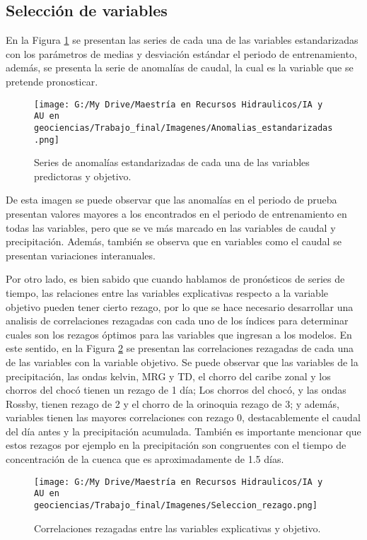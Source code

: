 \documentclass[draft]{agujournal2019}
\begin{document}
\subsection{Selección de variables}

En la Figura \ref{fig:series_estand} se presentan las series de cada una de las variables estandarizadas con los parámetros de medias y desviación estándar el periodo de entrenamiento, además, se presenta la serie de anomalías de caudal, la cual es la variable que se pretende pronosticar.

\begin{figure}[!]
	\centering%
	\texttt{[image: G:/My Drive/Maestría en Recursos Hidraulicos/IA y AU en geociencias/Trabajo\_final/Imagenes/Anomalias\_estandarizadas.png]}
	\caption{Series de anomalías estandarizadas de cada una de las variables predictoras y objetivo.} \label{fig:series_estand}
\end{figure}

De  esta imagen se puede observar que las anomalías en el periodo de prueba presentan valores mayores a los encontrados en el periodo de entrenamiento en todas las variables, pero que se ve más marcado en las variables de caudal y precipitación. Además, también se observa que en variables como el caudal se presentan variaciones interanuales.

Por otro lado, es bien sabido que cuando hablamos de pronósticos de series de tiempo, las relaciones entre las variables explicativas respecto a la variable objetivo pueden tener cierto rezago, por lo que se hace necesario desarrollar una analisis de correlaciones rezagadas con cada uno de los índices para determinar cuales son los rezagos óptimos para las variables que ingresan a los modelos. En este sentido, en la Figura \ref{fig:corr_resa} se presentan las correlaciones rezagadas de cada una de las variables con la variable objetivo. Se puede observar que las variables de la precipitación, las ondas kelvin, MRG y TD,  el chorro del caribe zonal y los chorros del chocó tienen un rezago de 1 día; Los chorros del chocó, y las ondas Rossby, tienen rezago de 2 y el chorro de la orinoquia rezago de 3; y además, variables tienen las mayores correlaciones con rezago 0, destacablemente el caudal del día antes y la precipitación acumulada. También es importante mencionar que estos rezagos por ejemplo en la precipitación son congruentes con el tiempo de concentración de la cuenca que es aproximadamente de 1.5 días.

\begin{figure}[!]
	\centering%
	\texttt{[image: G:/My Drive/Maestría en Recursos Hidraulicos/IA y AU en geociencias/Trabajo\_final/Imagenes/Seleccion\_rezago.png]}
	\caption{Correlaciones rezagadas entre las variables explicativas y objetivo.} \label{fig:corr_resa}
\end{figure}
\end{document}
